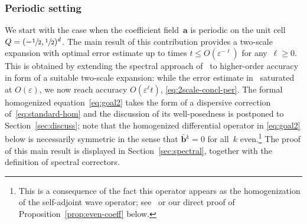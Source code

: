 \documentclass[JEP,XML,SOM,Unicode,published]{cedram}
\theoremstyle{plain}
\theoremstyle{definition}
\numberwithin{equation}{section}
\newcommand{\e}{\varepsilon}
\newcommand{\Aa}{\boldsymbol a}
\newcommand{\bb}{{\boldsymbol b}}
\begin{document}
\subsubsection{Periodic setting}
We start with the case when the coefficient field~$\Aa$ is periodic on the unit cell $Q=(-\sfrac12,\sfrac12)^d$. {The main result of this contribution provides} a two-scale expansion with optimal error estimate up to times $t\le O(\e^{-\ell})$ for any~$\ell\ge0$.
This is obtained by extending the spectral approach of~\cite{BG} to higher-order accuracy in form of a suitable two-scale expansion: while the error estimate in~\cite{BG} saturated at $O(\e)$, we now reach accuracy $O(\e^\ell t)$, \cf \eqref{eq:2scale-concl-per}.
The formal homogenized equation~\eqref{eq:goal2} takes the form of a dispersive correction of~\eqref{eq:standard-hom} and the discussion of its well-posedness is postponed to Section~\ref{sec:discuss}; note that the homogenized differential operator {in \eqref{eq:goal2} below} is necessarily symmetric in the sense that $\bar\bb{}^{k}=0$ for all~$k$ even.\footnote{This is a consequence of the fact this operator appears as the homogenization of the self-adjoint wave operator; see~\cite[Prop.\,1]{BG} or our direct proof of Proposition~\ref{prop:even-coeff} below.}
The proof of this main result is displayed in Section~\ref{sec:spectral}, together with the definition of spectral correctors.
\end{document}
